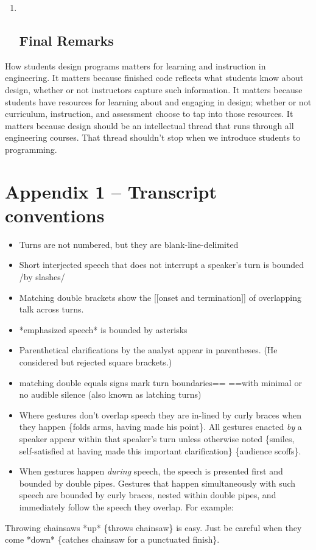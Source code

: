 \begin{enumerate}
\def\labelenumi{\arabic{enumi}.}
\item ~
  \subsection{Final Remarks}\label{final-remarks}
\end{enumerate}

How students design programs matters for learning and instruction in engineering. It matters because finished code reflects what students know about design, whether or not instructors capture such information. It matters because students have resources for learning about and engaging in design; whether or not curriculum, instruction, and assessment choose to tap into those resources. It matters because design should be an intellectual thread that runs through all engineering courses. That thread shouldn't stop when we introduce students to programming.

\section{Appendix 1 -- Transcript conventions}\label{appendix-1-transcript-conventions}

\begin{itemize}
\item
  Turns are not numbered, but they are blank-line-delimited
\item
  Short interjected speech that does not interrupt a speaker's turn is bounded /by slashes/
\item
  Matching double brackets show the {[}{[}onset and termination{]}{]} of overlapping talk across turns.
\item
  *emphasized speech* is bounded by asterisks
\item
  Parenthetical clarifications by the analyst appear in parentheses. (He considered but rejected square brackets.)
\item
  matching double equals signs mark turn boundaries== ==with minimal or no audible silence (also known as latching turns)
\item
  Where gestures don't overlap speech they are in-lined by curly braces when they happen \{folds arms, having made his point\}. All gestures enacted \emph{by} a speaker appear within that speaker's turn unless otherwise noted \{smiles, self-satisfied at having made this important clarification\} \{audience scoffs\}.
\item
  When gestures happen \emph{during} speech, the speech is presented first and bounded by double pipes. Gestures that happen simultaneously with such speech are bounded by curly braces, nested within double pipes, and immediately follow the speech they overlap. For example:
\end{itemize}

Throwing chainsaws \textbar{}\textbar{}*up*\textbar{}\textbar{} \textbar{}\{throws chainsaw\}\textbar{} is easy. Just be careful when they come \textbar{}\textbar{}*down*\textbar{}\textbar{} \textbar{}\{catches chainsaw for a punctuated finish\}\textbar{}.

